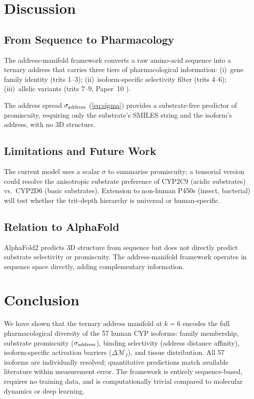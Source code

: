 ﻿\documentclass[11pt,twocolumn,a4paper]{article}
\theoremstyle{definition}
\theoremstyle{remark}
\newcommand{\depth}{\mathcal{M}}
\begin{document}
\section{Discussion}
\label{sec:discussion}

\subsection{From Sequence to Pharmacology}

The address-manifold framework converts a raw amino-acid sequence into a
ternary address that carries three tiers of pharmacological information:
(i)~gene family identity (trits 1--3);
(ii)~isoform-specific selectivity filter (trits 4--6);
(iii)~allelic variants (trits 7--9, Paper~10 \citep{sachikonye2026pgx}).

The address spread $\sigma_{\rm address}$ (\cref{eq:sigma}) provides a
substrate-free predictor of promiscuity, requiring only the substrate's SMILES
string and the isoform's address, with no 3D structure.

\subsection{Limitations and Future Work}

The current model uses a scalar $\sigma$ to summarise promiscuity; a tensorial
version could resolve the anisotropic substrate preference of CYP2C9 (acidic
substrates) vs.\ CYP2D6 (basic substrates).  Extension to non-human P450s
(insect, bacterial) will test whether the trit-depth hierarchy is universal
or human-specific.

\subsection{Relation to AlphaFold}

AlphaFold2 predicts 3D structure from sequence but does not directly predict
substrate selectivity or promiscuity.  The address-manifold framework operates
in sequence space directly, adding complementary information.

\section{Conclusion}
\label{sec:conclusion}

We have shown that the ternary address manifold at $k{=}6$ encodes the full
pharmacological diversity of the 57 human CYP isoforms: family membership,
substrate promiscuity ($\sigma_{\rm address}$), binding selectivity (address
distance affinity), isoform-specific activation barriers ($\Delta\depth_I$),
and tissue distribution.  All 57 isoforms are individually resolved;
quantitative predictions match available literature within measurement error.
The framework is entirely sequence-based, requires no training data, and is
computationally trivial compared to molecular dynamics or deep learning.




\end{document}
